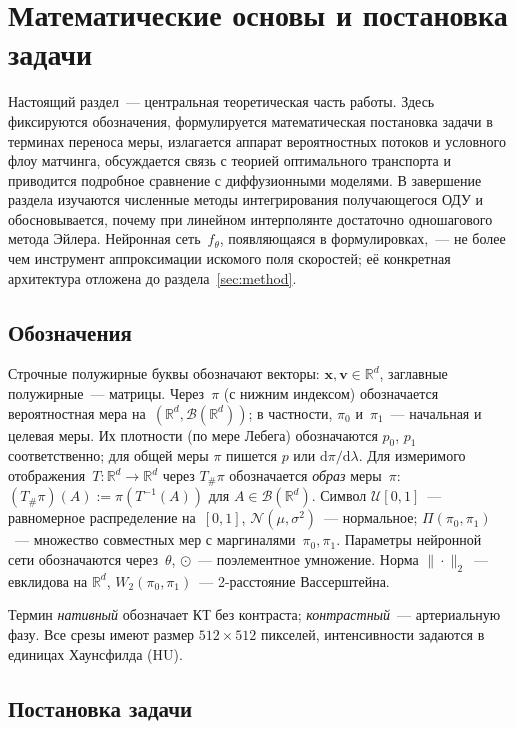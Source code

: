 \section{Математические основы и постановка задачи}
\label{sec:notation}

Настоящий раздел~--- центральная теоретическая часть работы. Здесь фиксируются обозначения, формулируется математическая постановка задачи в терминах переноса меры, излагается аппарат вероятностных потоков и условного флоу матчинга, обсуждается связь с теорией оптимального транспорта и приводится подробное сравнение с диффузионными моделями. В завершение раздела изучаются численные методы интегрирования получающегося ОДУ и обосновывается, почему при линейном интерполянте достаточно одношагового метода Эйлера. Нейронная сеть~$f_\theta$, появляющаяся в формулировках,~--- не более чем инструмент аппроксимации искомого поля скоростей; её конкретная архитектура отложена до раздела~\ref{sec:method}.

\subsection{Обозначения}

Строчные полужирные буквы обозначают векторы: $\mathbf{x}, \mathbf{v} \in \mathbb{R}^d$, заглавные полужирные~--- матрицы. Через~$\pi$ (с нижним индексом) обозначается вероятностная мера на~$(\mathbb{R}^d,\mathcal{B}(\mathbb{R}^d))$; в частности, $\pi_0$ и~$\pi_1$~--- начальная и целевая меры. Их плотности (по мере Лебега) обозначаются $p_0$, $p_1$ соответственно; для общей меры $\pi$ пишется $p$ или $\mathrm{d}\pi/\mathrm{d}\lambda$. Для измеримого отображения~$T:\mathbb{R}^d\to\mathbb{R}^d$ через $T_{\#}\pi$ обозначается \emph{образ} меры~$\pi$: $(T_{\#}\pi)(A) := \pi(T^{-1}(A))$ для $A\in\mathcal{B}(\mathbb{R}^d)$. Символ $\mathcal{U}[0,1]$~--- равномерное распределение на~$[0,1]$, $\mathcal{N}(\mu,\sigma^2)$~--- нормальное; $\Pi(\pi_0,\pi_1)$~--- множество совместных мер с маргиналями~$\pi_0,\pi_1$. Параметры нейронной сети обозначаются через~$\theta$, $\odot$~--- поэлементное умножение. Норма $\|\cdot\|_2$~--- евклидова на $\mathbb{R}^d$, $W_2(\pi_0,\pi_1)$~--- 2-расстояние Вассерштейна.

Термин \emph{нативный} обозначает КТ без контраста; \emph{контрастный}~--- артериальную фазу. Все срезы имеют размер $512\times512$ пикселей, интенсивности задаются в единицах Хаунсфилда (HU).

\subsection{Постановка задачи}

